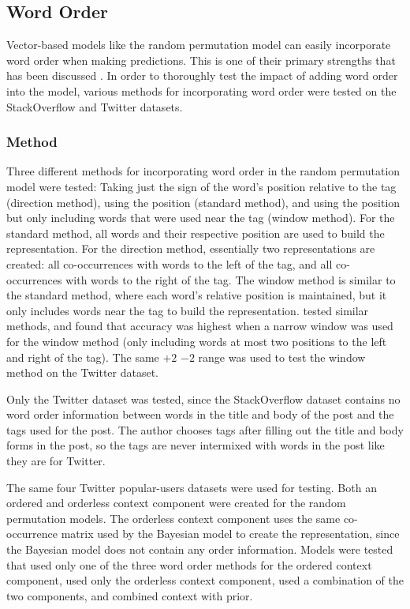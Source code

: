 \documentclass[man,floatsintext,donotrepeattitle]{apa6}
\begin{document}
\subsection{Word Order}

Vector-based models like the random permutation model can easily incorporate word order when making predictions.
This is one of their primary strengths that has been discussed \parencites{Jones2007, Sahlgren2008}.
In order to thoroughly test the impact of adding word order into the model, various methods for incorporating word order were tested on the StackOverflow and Twitter datasets.

\subsubsection{Method}

Three different methods for incorporating word order in the random permutation model were tested:
Taking just the sign of the word's position relative to the tag (direction method), using the position (standard method), and using the position but only including words that were used near the tag (window method).
For the standard method, all words and their respective position are used to build the representation.
For the direction method, essentially two representations are created: all co-occurrences with words to the left of the tag, and all co-occurrences with words to the right of the tag.
The window method is similar to the standard method, where each word's relative position is maintained, but it only includes words near the tag to build the representation.
\textcite{Sahlgren2008} tested similar methods, and found that accuracy was highest when a narrow window was used for the window method (only including words at most two positions to the left and right of the tag).
The same $+2$ $-2$ range was used to test the window method on the Twitter dataset.

Only the Twitter dataset was tested, since the StackOverflow dataset contains no word order information between words in the title and body of the post and the tags used for the post.
The author chooses tags after filling out the title and body forms in the post, so the tags are never intermixed with words in the post like they are for Twitter.

The same four Twitter popular-users datasets were used for testing.
Both an ordered and orderless context component were created for the random permutation models.
The orderless context component uses the same co-occurrence matrix used by the Bayesian model to create the representation, since the Bayesian model does not contain any order information.
Models were tested that used only one of the three word order methods for the ordered context component, used only the orderless context component, used a combination of the two components, and combined context with prior. 
\end{document}
